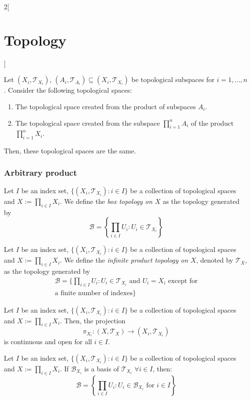 \documentclass[../../../main.tex]{subfiles}
\begin{document}
\begin{multicols}{2}[\section{Topology}]
\begin{prop}
  \end{prop}
  \begin{prop}
    Let $(X_i,\mathcal{T}_{X_i})$, $(A_i,\mathcal{T}_{A_i})\subseteq (X_i,\mathcal{T}_{X_i})$ be topological subspaces for $i=1,\ldots, n$. Consider the following topological spaces:
    \begin{enumerate}
      \item The topological space created from the product of subspaces $A_i$.
      \item The topological space created from the subspace $\prod_{i=1}^nA_i$ of the product $\prod_{i=1}^nX_i$.
    \end{enumerate}
    Then, these topological spaces are the same.
  \end{prop}
  \subsubsection{Arbitrary product}
  \begin{definition}
    Let $I$ be an index set, $\{(X_i,\mathcal{T}_{X_i}):i\in I\}$ be a collection of topological spaces and $X:=\prod_{i\in I}X_i$. We define the \textit{box topology on $X$} as the topology generated by $$\mathcal{B}=\left\{\prod_{i\in I}U_i:U_i\in\mathcal{T}_{X_i}\right\}$$
  \end{definition}
  \begin{definition}
    Let $I$ be an index set, $\{(X_i,\mathcal{T}_{X_i}):i\in I\}$ be a collection of topological spaces and $X:=\prod_{i\in I}X_i$. We define the \textit{infinite product topology on $X$}, denoted by $\mathcal{T}_X$, as the topology generated by
    \begin{multline*}
      \mathcal{B}=\Bigg\{\prod_{i\in I}U_i:U_i\in\mathcal{T}_{X_i}\text{ and $U_i=X_i$ except for}\\\text{a finite number of indexes}\Bigg\}
    \end{multline*}
  \end{definition}
  \begin{prop}
    Let $I$ be an index set, $\{(X_i,\mathcal{T}_{X_i}):i\in I\}$ be a collection of topological spaces and $X:=\prod_{i\in I}X_i$. Then, the projection $$\pi_{X_i}:\left(X,\mathcal{T}_X\right)\longrightarrow (X_i,\mathcal{T}_{X_i})$$
    is continuous and open for all $i\in I$.
  \end{prop}
  \begin{prop}
    Let $I$ be an index set, $\{(X_i,\mathcal{T}_{X_i}):i\in I\}$ be a collection of topological spaces and $X:=\prod_{i\in I}X_i$. If $\mathcal{B}_{X_i}$ is a basis of $\mathcal{T}_{X_i}$ $\forall i\in I$, then: $$\mathcal{B}=\left\{\prod_{i\in I}U_i:U_i\in\mathcal{B}_{X_i}\text{ for }i\in I\right\}$$

\end{prop}
\end{multicols}
\end{document}
